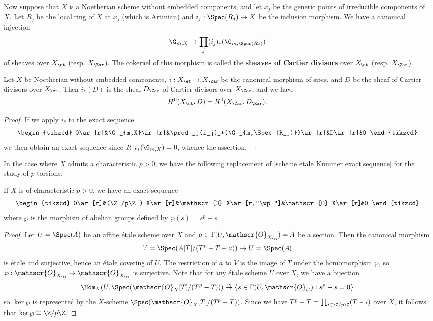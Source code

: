 Now suppose that $X$ is a Noetherian scheme without embedded components, and let $x_j$ be the generic points of irreducible components of $X$. Let $R_j$ be the local ring of $X$ at $x_j$ (which is Artinian) and $i_j:\Spec(R_j)\to X$ be the inclusion morphism. We have a canonical injection
\[\G_{m,X}\to\prod_j(i_j)_*(\G_{m,\Spec(R_j)})\]
of sheaves over $X_\et$ (resp. $X_\Zar$). The cokernel of this morphism is called the \textbf{sheaves of Cartier divisors} over $X_\et$ (resp. $X_\Zar$).

\begin{corollary}\label{scheme Noe etale Cartier divisor sheaf direct image of Zar}
Let $X$ be Noetherian without embedded components, $i:X_\et\to X_\Zar$ be the canonical morphism of sites, and $D$ be the sheaf of Cartier divisors over $X_\et$. Then $i_*(D)$ is the sheaf $D_\Zar$ of Cartier divisors over $X_\Zar$, and we have
\[H^0(X_\et,D)=H^0(X_\Zar,D_\Zar).\]
\end{corollary}
\begin{proof}
If we apply $i_*$ to the exact sequence
\[\begin{tikzcd}
0\ar[r]&\G_{m,X}\ar[r]&\prod_j(i_j)_*(\G_{m,\Spec(R_j)})\ar[r]&D\ar[r]&0
\end{tikzcd}\]
we then obtain an exact sequence since $R^1i_*(\G_{m,X})=0$, whence the assertion.
\end{proof}

In the case where $X$ admits a characteristic $p>0$, we have the following replacement of \cref{scheme etale Kummer exact sequence} for the study of $p$-torsions:
\begin{theorem}\label{scheme etale Artin-Schreier exact sequence}
If $X$ is of characteristic $p>0$, we have an exact sequence
\[\begin{tikzcd}
0\ar[r]&(\Z/p\Z)_X\ar[r]&\mathscr{O}_X\ar[r,"\wp"]&\mathscr{O}_X\ar[r]&0
\end{tikzcd}\]
where $\wp$ is the morphism of abelian groups defined by $\wp(s)=s^p-s$.
\end{theorem}
\begin{proof}
Let $U=\Spec(A)$ be an affine \'etale scheme over $X$ and $a\in\Gamma(U,\mathscr{O}_{X_\et})=A$ be a section. Then the canonical morphism
\[V=\Spec(A[T]/(T^p-T-a))\to U=\Spec(A)\]
is \'etale and surjective, hence an \'etale covering of $U$. The restriction of $a$ to $V$ is the image of $T$ under the homomorphism $\wp$, so $\wp:\mathscr{O}_{X_\et}\to\mathscr{O}_{X_\et}$ is surjective. Note that for any \'etale scheme $U$ over $X$, we have a bijection
\[\Hom_X(U,\Spec(\mathscr{O}_X[T]/(T^p-T)))\stackrel{\sim}{\to} \{s\in\Gamma(U,\mathscr{O}_U):s^p-s=0\}\]
so $\ker\wp$ is represented by the $X$-scheme $\Spec(\mathscr{O}_X[T]/(T^p-T))$. Since we have $T^p-T=\prod_{i\in\Z/p\Z}(T-i)$ over $X$, it follows that $\ker\wp\cong\Z/p\Z$.
\end{proof}

